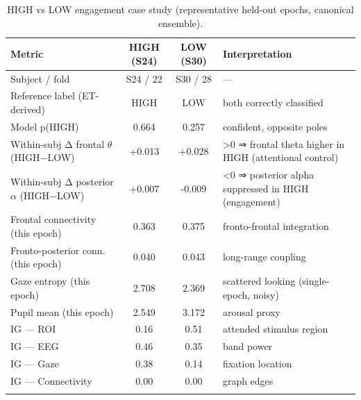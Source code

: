 \begin{table}[t]
\centering
\caption{HIGH vs LOW engagement case study (representative held-out epochs, canonical ensemble).}
\label{tab:case_study}
\begin{tabular}{lccl}
\toprule
Metric & HIGH (S24) & LOW (S30) & Interpretation \\
\midrule
Subject / fold & S24 / 22 & S30 / 28 & — \\
Reference label (ET-derived) & HIGH & LOW & both correctly classified \\
Model p(HIGH) & 0.664 & 0.257 & confident, opposite poles \\
Within-subj Δ frontal $\theta$ (HIGH−LOW) & +0.013 & +0.028 & >0 ⇒ frontal theta higher in HIGH (attentional control) \\
Within-subj Δ posterior $\alpha$ (HIGH−LOW) & +0.007 & -0.009 & <0 ⇒ posterior alpha suppressed in HIGH (engagement) \\
Frontal connectivity (this epoch) & 0.363 & 0.375 & fronto-frontal integration \\
Fronto-posterior conn. (this epoch) & 0.040 & 0.043 & long-range coupling \\
Gaze entropy (this epoch) & 2.708 & 2.369 & scattered looking (single-epoch, noisy) \\
Pupil mean (this epoch) & 2.549 & 3.172 & arousal proxy \\
IG — ROI & 0.16 & 0.51 & attended stimulus region \\
IG — EEG & 0.46 & 0.35 & band power \\
IG — Gaze & 0.38 & 0.14 & fixation location \\
IG — Connectivity & 0.00 & 0.00 & graph edges \\
\botrule
\end{tabular}
\end{table}
